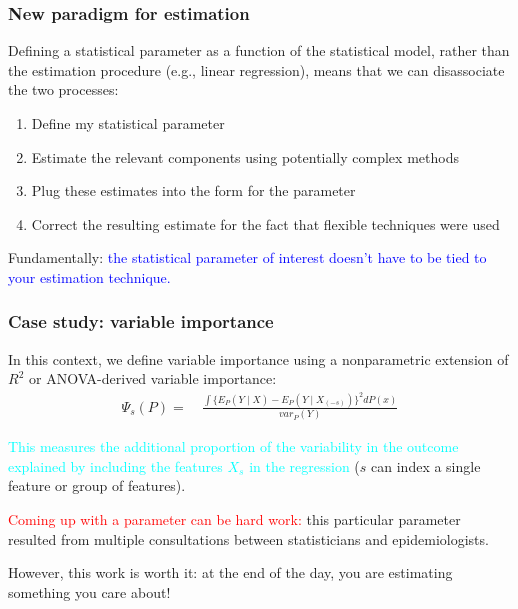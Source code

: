 \documentclass[12pt, 
hyperref={colorlinks=true, linkcolor=blue, urlcolor=cyan}]{beamer}
\begin{document}
\begin{frame}
\frametitle{New paradigm for estimation}
Defining a statistical parameter as a function of the statistical model, rather than the estimation procedure (e.g., linear regression), means that we can disassociate the two processes:
\begin{enumerate}
\item Define my statistical parameter
\item Estimate the relevant components using potentially complex methods
\item Plug these estimates into the form for the parameter
\item Correct the resulting estimate for the fact that flexible techniques were used
\end{enumerate}

Fundamentally: \textcolor{blue}{the statistical parameter of interest doesn't have to be tied to your estimation technique.}
\end{frame}

\begin{frame}
\frametitle{Case study: variable importance}
In this context, we define variable importance using a nonparametric extension of $R^2$ or ANOVA-derived variable importance:
\begin{align*}
\Psi_s(P) = &\ \frac{\int \{E_P(Y \mid X) - E_P(Y \mid X_{(-s)})\}^2 dP(x)}{var_P(Y)}
\end{align*}

\textcolor{cyan}{This measures the additional proportion of the variability in the outcome explained by including the features $X_s$ in the regression} ($s$ can index a single feature or group of features).

\textcolor{red}{Coming up with a parameter can be hard work:} this particular parameter resulted from multiple consultations between statisticians and epidemiologists.

However, this work is worth it: at the end of the day, you are estimating something you care about!
\end{frame}
\end{document}
